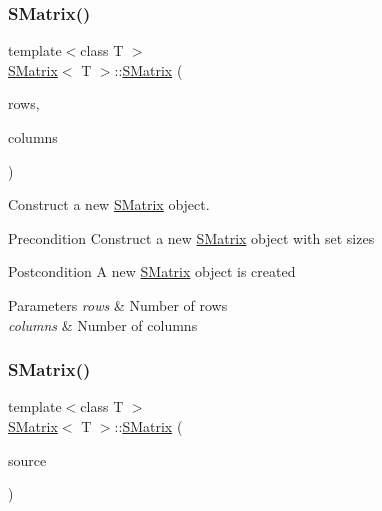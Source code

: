 \subsubsection{\texorpdfstring{SMatrix()}{SMatrix()}\hspace{0.1cm}{\footnotesize\ttfamily [2/4]}}
{\footnotesize\ttfamily template$<$class T $>$ \\
\mbox{\hyperlink{class_s_matrix}{S\+Matrix}}$<$ T $>$\+::\mbox{\hyperlink{class_s_matrix}{S\+Matrix}} (\begin{DoxyParamCaption}\item[{int}]{rows,  }\item[{int}]{columns }\end{DoxyParamCaption})}



Construct a new \mbox{\hyperlink{class_s_matrix}{S\+Matrix}} object. 

\begin{DoxyPrecond}{Precondition}
Construct a new \mbox{\hyperlink{class_s_matrix}{S\+Matrix}} object with set sizes 
\end{DoxyPrecond}
\begin{DoxyPostcond}{Postcondition}
A new \mbox{\hyperlink{class_s_matrix}{S\+Matrix}} object is created 
\end{DoxyPostcond}

\begin{DoxyParams}{Parameters}
{\em rows} & Number of rows \\
\hline
{\em columns} & Number of columns \\
\hline
\end{DoxyParams}
\mbox{\label{class_s_matrix_a990db48a76c4aaa9f7152335ae3e8cd1}} 
\subsubsection{\texorpdfstring{SMatrix()}{SMatrix()}\hspace{0.1cm}{\footnotesize\ttfamily [3/4]}}
{\footnotesize\ttfamily template$<$class T $>$ \\
\mbox{\hyperlink{class_s_matrix}{S\+Matrix}}$<$ T $>$\+::\mbox{\hyperlink{class_s_matrix}{S\+Matrix}} (\begin{DoxyParamCaption}\item[{const \mbox{\hyperlink{class_s_matrix}{S\+Matrix}}$<$ T $>$ \&}]{source }\end{DoxyParamCaption})}



